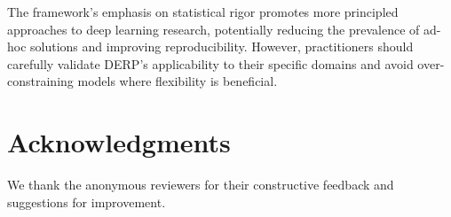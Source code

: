 \documentclass{article}
\begin{document}
The framework's emphasis on statistical rigor promotes more principled approaches to deep learning research, potentially reducing the prevalence of ad-hoc solutions and improving reproducibility. However, practitioners should carefully validate DERP's applicability to their specific domains and avoid over-constraining models where flexibility is beneficial.

\section*{Acknowledgments}

We thank the anonymous reviewers for their constructive feedback and suggestions for improvement.

\small


\end{document}
